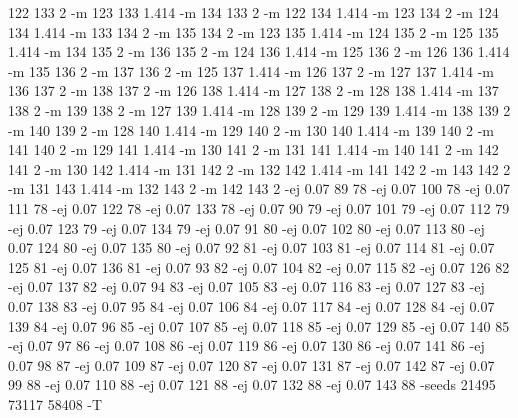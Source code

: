 \documentclass[12pt]{article}
\begin{document}
122 133 2 -m 123 133 1.414 -m 134 133 2 -m 122 134 1.414 -m 123 134 2 -m 124 134 1.414 -m 133 134 2 -m 135 134 2 -m 123 135 1.414 -m 124 135 2 -m 125 135 1.414 -m 134 135 2 -m 136 135 2 -m 124 136 1.414 -m 125 136 2 -m 126 136 1.414 -m 135 136 2 -m 137 136 2 -m 125 137 1.414 -m 126 137 2 -m 127 137 1.414 -m 136 137 2 -m 138 137 2 -m 126 138 1.414 -m 127 138 2 -m 128 138 1.414 -m 137 138 2 -m 139 138 2 -m 127 139 1.414 -m 128 139 2 -m 129 139 1.414 -m 138 139 2 -m 140 139 2 -m 128 140 1.414 -m 129 140 2 -m 130 140 1.414 -m 139 140 2 -m 141 140 2 -m 129 141 1.414 -m 130 141 2 -m 131 141 1.414 -m 140 141 2 -m 142 141 2 -m 130 142 1.414 -m 131 142 2 -m 132 142 1.414 -m 141 142 2 -m 143 142 2 -m 131 143 1.414 -m 132 143 2 -m 142 143 2 -ej 0.07 89 78 -ej 0.07 100 78 -ej 0.07 111 78 -ej 0.07 122 78 -ej 0.07 133 78 -ej 0.07 90 79 -ej 0.07 101 79 -ej 0.07 112 79 -ej 0.07 123 79 -ej 0.07 134 79 -ej 0.07 91 80 -ej 0.07 102 80 -ej 0.07 113 80 -ej 0.07 124 80 -ej 0.07 135 80 -ej 0.07 92 81 -ej 0.07 103 81 -ej 0.07 114 81 -ej 0.07 125 81 -ej 0.07 136 81 -ej 0.07 93 82 -ej 0.07 104 82 -ej 0.07 115 82 -ej 0.07 126 82 -ej 0.07 137 82 -ej 0.07 94 83 -ej 0.07 105 83 -ej 0.07 116 83 -ej 0.07 127 83 -ej 0.07 138 83 -ej 0.07 95 84 -ej 0.07 106 84 -ej 0.07 117 84 -ej 0.07 128 84 -ej 0.07 139 84 -ej 0.07 96 85 -ej 0.07 107 85 -ej 0.07 118 85 -ej 0.07 129 85 -ej 0.07 140 85 -ej 0.07 97 86 -ej 0.07 108 86 -ej 0.07 119 86 -ej 0.07 130 86 -ej 0.07 141 86 -ej 0.07 98 87 -ej 0.07 109 87 -ej 0.07 120 87 -ej 0.07 131 87 -ej 0.07 142 87 -ej 0.07 99 88 -ej 0.07 110 88 -ej 0.07 121 88 -ej 0.07 132 88 -ej 0.07 143 88 -seeds 21495 73117 58408 -T

\newpage
\end{document}
